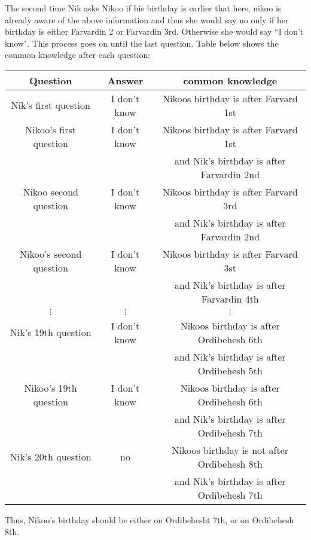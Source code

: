 \begin{solution}
The second time Nik asks Nikoo if his birthday is earlier that hers, nikoo is already aware of the above information and thus she would say no only if her birthday is either Farvardin 2 or Farvardin 3rd. Otherwise she would say ``I don't know".  This process goes on until the last question. Table below shows the common knowledge after each question:
\begin{center}
	\begin{tabular}{|c|c|c|}
		\hline
		Question & Answer & common knowledge\\
		\hline
		Nik's first question & I don't know & Nikoos birthday is after Farvard 1st \\
		\hline 
		Nikoo's first question & I don't know & Nikoos birthday is after Farvard 1st\\
		& &  and Nik's birthday is after Farvardin 2nd \\
		\hline
		Nikoo second question & I don't know & Nikoos birthday is after Farvard 3rd\\
		& &  and Nik's birthday is after Farvardin 2nd \\
		\hline
		Nikoo's second question & I don't know & Nikoos birthday is after Farvard 3st\\
		& &  and Nik's birthday is after Farvardin 4th \\
		\hline
		$\vdots$ & $\vdots$ & $\vdots$ \\
		\hline
		Nik's 19th question & I don't know & Nikoos birthday is after Ordibehesh 6th\\
		& &  and Nik's birthday is after Ordibehesh 5th \\
		\hline
		Nikoo's 19th question & I don't know & Nikoos birthday is after Ordibehesh 6th \\
		& &  and Nik's birthday is after Ordibehesh 7th \\
		\hline
		Nik's 20th question & no & Nikoos birthday is not after Ordibehesh 8th\\
		& &  and Nik's birthday is after Ordibehesh 7th \\
		\hline
	\end{tabular}
\end{center}
Thus, Nikoo's birthday should be either on Ordibehesht 7th, or on Ordibehesh 8th.
\end{solution}

